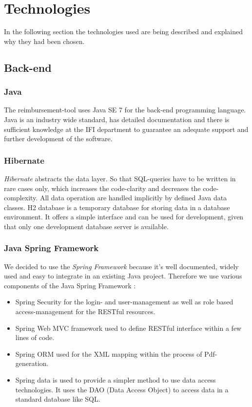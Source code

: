 \section{Technologies}

In the following section the technologies used are being described and explained why they had been chosen.

\subsection{Back-end}

\subsubsection{Java}
The reimbursement-tool uses Java SE 7 for the back-end programming language. Java is an industry wide standard, has detailed documentation and there is sufficient knowledge at the IFI department to guarantee an adequate support and further development of the software.

\subsubsection{Hibernate}
\textit{Hibernate} abstracts the data layer. So that SQL-queries have to be written in rare cases only, which increases the code-clarity and decreases the code-complexity. All data operation are handled implicitly by defined Java data classes.\newline
H2 database is a temporary database for storing data in a database environment. It offers a simple interface and can be used for development, given that only one development database server is available. \cite{hibernate}

\subsubsection{Java Spring Framework}
We decided to use the \textit{Spring Framework} because it's well documented, widely used and easy to integrate in an existing Java project. Therefore we use various components of the Java Spring Framework \cite{spring}:
\begin{itemize}
    \item Spring Security for the login- and user-management as well as role based access-management for the RESTful resources.
    \item Spring Web MVC framework used to define RESTful interface within a few lines of code.
    \item Spring ORM used for the XML mapping within the process of Pdf-generation.
    \item Spring data is used to provide a simpler method to use data access technologies. It uses the DAO (Data Access Object) \cite{dao} to access data in a standard database like SQL.
\end{itemize}

